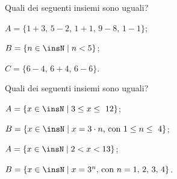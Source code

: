 \begin{esercizio}
Quali dei seguenti insiemi sono uguali?
 \begin{enumeratea}
 \item $A=\{1+3\text{, }5-2\text{, }1+1\text{, }9-8\text{, }1-1\}$;
\item $B=\{n\in\insN\mid n<5\}$;
\item $C=\{6-4\text{, }6+4\text{, }6-6\}$.
 \end{enumeratea}
\end{esercizio}
\pagebreak
\begin{esercizio}
Quali dei seguenti insiemi sono uguali?
\begin{multicols}{2}
\begin{enumeratea}
\item $A=\{x\in\insN\mid 3\le x\le~12\}$;
\item $B=\{x\in\insN\mid x=3\cdot n\text{, con } 1\le n\le~4\}$;
\item $A=\{x\in\insN\mid 2<x<13\}$;
\item $B=\{x\in\insN\mid x=3^{n}\text{, con }n=\text{1, 2, 3, 4}\}$.
\end{enumeratea}
\end{multicols}
\end{esercizio}
